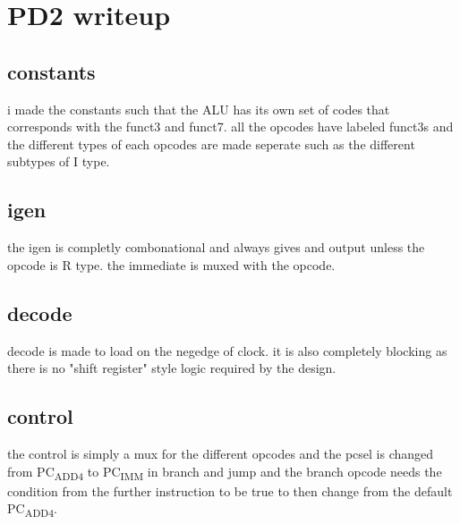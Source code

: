 \documentclass[11pt]{article}
\date{\today}
\title{}
\begin{document}
\tableofcontents

\section{PD2 writeup}
\label{sec:org465eae0}
\subsection{constants}
\label{sec:org3444244}
i made the constants such that the ALU has its own set of codes
that corresponds with the funct3 and funct7. all the opcodes have
labeled funct3s and the different types of each opcodes are made
seperate such as the different subtypes of I type.
\subsection{igen}
\label{sec:orgd562f32}
the igen is completly combonational and always gives and output
unless the opcode is R type. the immediate is muxed with the
opcode.
\subsection{decode}
\label{sec:org0a299f3}
decode is made to load on the negedge of clock. it is also
completely blocking as there is no "shift register" style logic
required by the design.
\subsection{control}
\label{sec:org398f2f5}
the control is simply a mux for the different opcodes and the
pcsel is changed from PC\textsubscript{ADD4} to PC\textsubscript{IMM} in branch and jump and the
branch opcode needs the condition from the further instruction to
be true to then change from the default PC\textsubscript{ADD4}.
\end{document}
